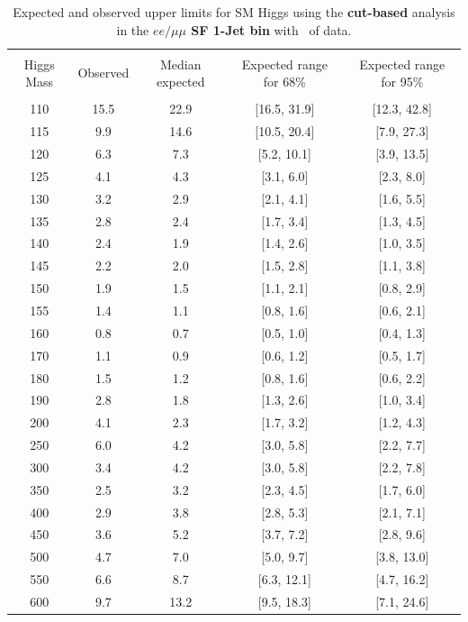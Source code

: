 \begin{table}[hbp!]
\begin{center}
\begin{tabular}{c c c c c}
\hline
\vspace{-3mm} && \\
 Higgs Mass & Observed  & Median expected & Expected range for 68\% & Expected range for 95\%   \\
\vspace{-3mm} && \\
\hline
110 & 15.5 & 22.9 & [16.5, 31.9] & [12.3, 42.8] \\
115 & 9.9 & 14.6 & [10.5, 20.4] & [7.9, 27.3] \\
120 & 6.3 & 7.3 & [5.2, 10.1] & [3.9, 13.5] \\
125 & 4.1 & 4.3 & [3.1, 6.0] & [2.3, 8.0] \\
130 & 3.2 & 2.9 & [2.1, 4.1] & [1.6, 5.5] \\
135 & 2.8 & 2.4 & [1.7, 3.4] & [1.3, 4.5] \\
140 & 2.4 & 1.9 & [1.4, 2.6] & [1.0, 3.5] \\
145 & 2.2 & 2.0 & [1.5, 2.8] & [1.1, 3.8] \\
150 & 1.9 & 1.5 & [1.1, 2.1] & [0.8, 2.9] \\
155 & 1.4 & 1.1 & [0.8, 1.6] & [0.6, 2.1] \\
160 & 0.8 & 0.7 & [0.5, 1.0] & [0.4, 1.3] \\
170 & 1.1 & 0.9 & [0.6, 1.2] & [0.5, 1.7] \\
180 & 1.5 & 1.2 & [0.8, 1.6] & [0.6, 2.2] \\
190 & 2.8 & 1.8 & [1.3, 2.6] & [1.0, 3.4] \\
200 & 4.1 & 2.3 & [1.7, 3.2] & [1.2, 4.3] \\
250 & 6.0 & 4.2 & [3.0, 5.8] & [2.2, 7.7] \\
300 & 3.4 & 4.2 & [3.0, 5.8] & [2.2, 7.8] \\
350 & 2.5 & 3.2 & [2.3, 4.5] & [1.7, 6.0] \\
400 & 2.9 & 3.8 & [2.8, 5.3] & [2.1, 7.1] \\
450 & 3.6 & 5.2 & [3.7, 7.2] & [2.8, 9.6] \\
500 & 4.7 & 7.0 & [5.0, 9.7] & [3.8, 13.0] \\
550 & 6.6 & 8.7 & [6.3, 12.1] & [4.7, 16.2] \\
600 & 9.7 & 13.2 & [9.5, 18.3] & [7.1, 24.6] \\
\hline
\end{tabular}
\caption{Expected and observed upper limits for SM Higgs using the
  {\bf cut-based} analysis in the {\bf $ee/\mu\mu$ SF 1-Jet bin} with \intlumiEightTeV\ of data.}
\label{tab:cutbase_uls_1jsf}
\end{center}
\end{table}


